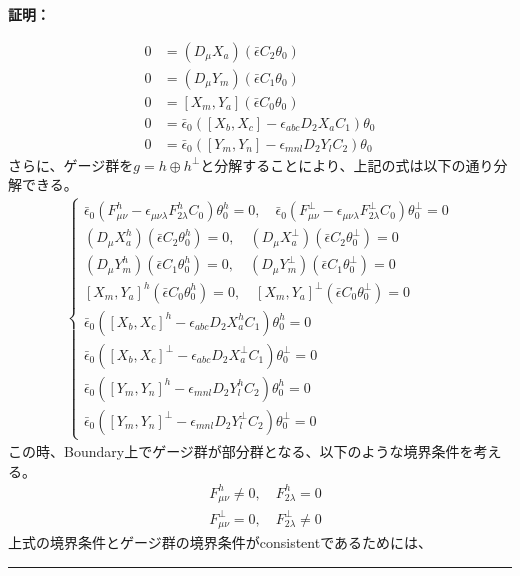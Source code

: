 \documentclass[dvipdfmx,a4paper,10.5pt]{article}
\numberwithin{equation}{section}
\newenvironment{proofbox}
{\begin{prooflabel}\textbf{証明：}\end{prooflabel}\vspace{0.8em}}
{\par\vspace{1em}\hrule\vspace{1em}}
\begin{document}
\begin{proofbox}
\begin{equation}
\begin{split}
    0&=(D_{\mu}X_{a})(\bar{\epsilon}C_{2}\theta_{0})\\
    0&=(D_{\mu}Y_{m})(\bar{\epsilon}C_{1}\theta_{0})\\
    0&=[X_{m},Y_{a}](\bar{\epsilon}C_{0}\theta_{0})\\
    0&=\bar{\epsilon}_{0}([X_{b},X_{c}]-\epsilon_{abc}D_{2}X_{a}C_{1})\theta_{0}\\
    0&=\bar{\epsilon}_{0}([Y_{m},Y_{n}]-\epsilon_{mnl}D_{2}Y_{l}C_{2})\theta_{0}
\end{split}
\end{equation}
さらに、ゲージ群を$g=h\oplus h^{\perp}$と分解することにより、上記の式は以下の通り分解できる。
\begin{align*}
    \begin{cases}
            \bar{\epsilon}_{0}(F^{h}_{\mu\nu}-\epsilon_{\mu\nu\lambda}F_{2\lambda}^{h}C_{0})\theta_{0}^{h}=0,\quad
    \bar{\epsilon}_{0}(F^{\perp}_{\mu\nu}-\epsilon_{\mu\nu\lambda}F_{2\lambda}^{\perp}C_{0})\theta_{0}^{\perp}=0\\
    (D_{\mu}X_{a}^{h})(\bar{\epsilon}C_{2}\theta_{0}^{h})=0,\quad
    (D_{\mu}X_{a}^{\perp})(\bar{\epsilon}C_{2}\theta_{0}^{\perp})=0\\
    (D_{\mu}Y_{m}^{h})(\bar{\epsilon}C_{1}\theta_{0}^{h})=0,\quad
    (D_{\mu}Y_{m}^{\perp})(\bar{\epsilon}C_{1}\theta_{0}^{\perp})=0\\
    [X_{m},Y_{a}]^{h}(\bar{\epsilon}C_{0}\theta_{0}^{h})=0,
    \quad[X_{m},Y_{a}]^{\perp}(\bar{\epsilon}C_{0}\theta_{0}^{\perp})=0\\
    \bar{\epsilon}_{0}([X_{b},X_{c}]^{h}-\epsilon_{abc}D_{2}X_{a}^{h}C_{1})\theta_{0}^{h}=0\\
    \bar{\epsilon}_{0}([X_{b},X_{c}]^{\perp}-\epsilon_{abc}D_{2}X_{a}^{\perp}C_{1})\theta_{0}^{\perp}=0\\
    \bar{\epsilon}_{0}([Y_{m},Y_{n}]^{h}-\epsilon_{mnl}D_{2}Y^{h}_{l}C_{2})\theta_{0}^{h}=0\\
    \bar{\epsilon}_{0}([Y_{m},Y_{n}]^{\perp}-\epsilon_{mnl}D_{2}Y^{\perp}_{l}C_{2})\theta_{0}^{\perp}=0
        \end{cases}
\end{align*}
この時、Boundary上でゲージ群が部分群となる、以下のような境界条件を考える。
    \begin{align*}
        &F_{\mu\nu}^{h}\neq0,\quad F^{h}_{2\lambda}=0\\
        &F_{\mu\nu}^{\perp}=0,\quad F^{\perp}_{2\lambda}\neq0
    \end{align*}
上式の境界条件とゲージ群の境界条件がconsistentであるためには、

\end{proofbox}
\end{document}
